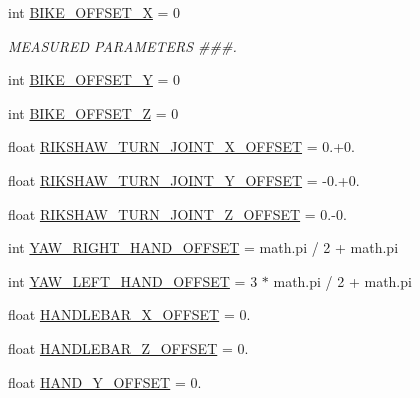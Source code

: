 \begin{DoxyCompactItemize}
\item 
int \mbox{\hyperlink{namespacesteering__trajectory__test_a980b24651c8baeee17f5190d42d857f7}{B\+I\+K\+E\+\_\+\+O\+F\+F\+S\+E\+T\+\_\+X}} = 0
\begin{DoxyCompactList}\small\item\em M\+E\+A\+S\+U\+R\+ED P\+A\+R\+A\+M\+E\+T\+E\+RS \#\#\#. \end{DoxyCompactList}\item 
int \mbox{\hyperlink{namespacesteering__trajectory__test_a76e572c61cb2ab9e42f629279fc411f7}{B\+I\+K\+E\+\_\+\+O\+F\+F\+S\+E\+T\+\_\+Y}} = 0
\item 
int \mbox{\hyperlink{namespacesteering__trajectory__test_a43afae8674b206e4307128be52bc3413}{B\+I\+K\+E\+\_\+\+O\+F\+F\+S\+E\+T\+\_\+Z}} = 0
\item 
float \mbox{\hyperlink{namespacesteering__trajectory__test_acb792436582351e8afcbc1c2a80f665e}{R\+I\+K\+S\+H\+A\+W\+\_\+\+T\+U\+R\+N\+\_\+\+J\+O\+I\+N\+T\+\_\+\+X\+\_\+\+O\+F\+F\+S\+ET}} = 0.+0.
\item 
float \mbox{\hyperlink{namespacesteering__trajectory__test_ad1fd68e391bd33260caefd91e3598aef}{R\+I\+K\+S\+H\+A\+W\+\_\+\+T\+U\+R\+N\+\_\+\+J\+O\+I\+N\+T\+\_\+\+Y\+\_\+\+O\+F\+F\+S\+ET}} = -\/0.+0.
\item 
float \mbox{\hyperlink{namespacesteering__trajectory__test_aa3e59ede4bbf59e311cf2f5af97a3051}{R\+I\+K\+S\+H\+A\+W\+\_\+\+T\+U\+R\+N\+\_\+\+J\+O\+I\+N\+T\+\_\+\+Z\+\_\+\+O\+F\+F\+S\+ET}} = 0.-\/0.
\item 
int \mbox{\hyperlink{namespacesteering__trajectory__test_a1e9d052ea83a9b066657437bbdd92b81}{Y\+A\+W\+\_\+\+R\+I\+G\+H\+T\+\_\+\+H\+A\+N\+D\+\_\+\+O\+F\+F\+S\+ET}} = math.\+pi / 2 + math.\+pi
\item 
int \mbox{\hyperlink{namespacesteering__trajectory__test_a2e3bb44f47ba04a893958cd3fa2d1764}{Y\+A\+W\+\_\+\+L\+E\+F\+T\+\_\+\+H\+A\+N\+D\+\_\+\+O\+F\+F\+S\+ET}} = 3 $\ast$ math.\+pi / 2 + math.\+pi
\item 
float \mbox{\hyperlink{namespacesteering__trajectory__test_a9d2c71bfe19d81c3f21c2aa9206795a2}{H\+A\+N\+D\+L\+E\+B\+A\+R\+\_\+\+X\+\_\+\+O\+F\+F\+S\+ET}} = 0.
\item 
float \mbox{\hyperlink{namespacesteering__trajectory__test_a6d423923cfe7feb2e9c8ea6163e73bb0}{H\+A\+N\+D\+L\+E\+B\+A\+R\+\_\+\+Z\+\_\+\+O\+F\+F\+S\+ET}} = 0.
\item 
float \mbox{\hyperlink{namespacesteering__trajectory__test_ad3595707da19a9e4be5276b90589b46d}{H\+A\+N\+D\+\_\+\+Y\+\_\+\+O\+F\+F\+S\+ET}} = 0.

\end{DoxyCompactItemize}
